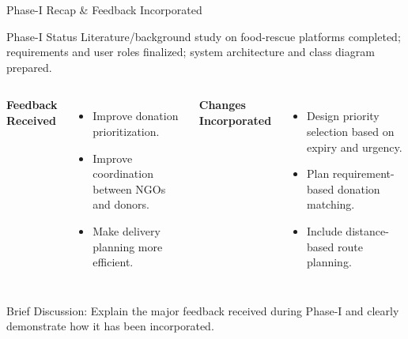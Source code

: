 \documentclass[aspectratio=169,11pt]{beamer}
\newcommand{\smallnote}[1]{%
\vspace{0.08cm}
{\scriptsize\color{GEUGrey}#1}
}
\begin{document}
\begin{frame}{Phase-I Recap \& Feedback Incorporated}

\begin{block}{Phase-I Status}
Literature/background study on food-rescue platforms completed; requirements and user roles finalized; system architecture and class diagram prepared.
\end{block}

\vspace{2mm}

\begin{columns}[T,totalwidth=\textwidth]


\textbf{\color{GEUBlue}Feedback Received}

\begin{itemize}\itemsep2pt
\item Improve donation prioritization.
\item Improve coordination between NGOs and donors.
\item Make delivery planning more efficient.
\end{itemize}


\textbf{\color{GEUBlue}Changes Incorporated}

\begin{itemize}\itemsep2pt
\item Design priority selection based on expiry and urgency.
\item Plan requirement-based donation matching.
\item Include distance-based route planning.
\end{itemize}

\end{columns}

\vfill

\smallnote{
Brief Discussion: Explain the major feedback received during Phase-I
and clearly demonstrate how it has been incorporated.
}

\end{frame}
\end{document}
